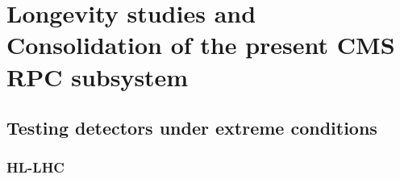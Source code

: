 \graphicspath{{chapt_dutch/}{intro/}{chapt2/}{chapt3/}{chapt4/}{chapt5/}{chapt6/}{chapt7/}}

\renewcommand\evenpagerightmark{{\scshape\small Chapter 5}}
\renewcommand\oddpageleftmark{{\scshape\small Consolidation and Research and Development approval}}

\hyphenation{}

\chapter[Longevity studies and Consolidation of the present \acs{CMS} \acs{RPC} subsystem]%
{Longevity studies and Consolidation of the present \acs{CMS} \acs{RPC} subsystem}
\label{chapt:5}

\section{Testing detectors under extreme conditions}
\label{sec:extreme}

	\subsection{\acl{HL-LHC}}
	\label{ssec:HL-LHC}
	
